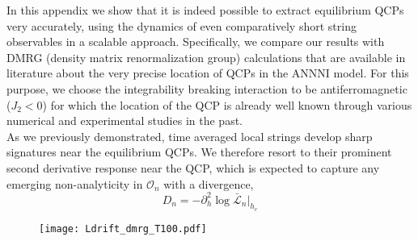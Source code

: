 \documentclass[aps,prx,twocolumn]{revtex4-2}
\begin{document}
{{ {In this appendix we show that it is indeed possible to extract equilibrium QCPs very accurately, using the dynamics of even comparatively short string observables in a scalable approach. Specifically, we compare our results with DMRG (density matrix renormalization group) calculations that are available in literature about the very precise location of QCPs in the ANNNI model. For this purpose, we choose the integrability breaking interaction to be antiferromagnetic ($J_2<0$) for which the location of the QCP is already well known \cite{matteo06} through various numerical and experimental studies in the past.}\\

 {As we previously demonstrated, time averaged local strings develop sharp signatures near the equilibrium QCPs. We therefore resort to their prominent second derivative response near the QCP, which is expected to capture any emerging non-analyticity in $\mathcal{O}_n$ with a divergence,
\begin{equation}\label{eq:der_min_a}
		D_n = -\partial_h^2\log\bar{\mathcal{L}}_n\left.\right|_{h_c}
\end{equation}}
\begin{figure}
	\centering
	\texttt{[image: Ldrift\_dmrg\_T100.pdf]}
	

\end{figure}}}
\end{document}
